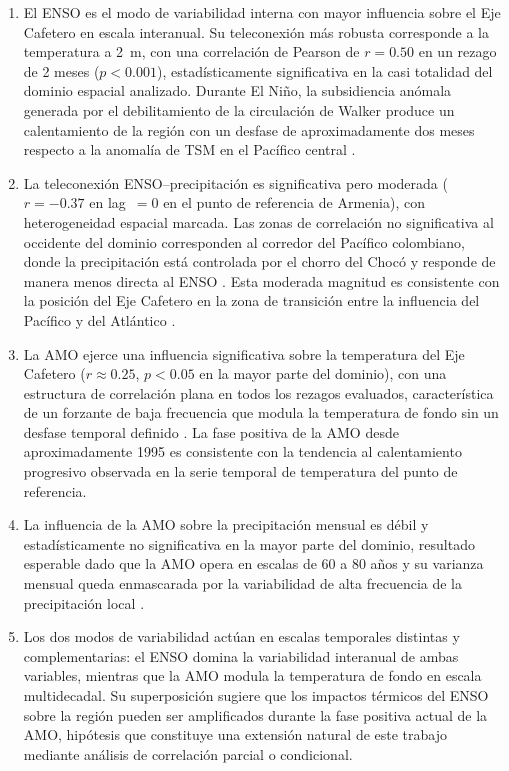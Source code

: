 \documentclass[12pt, a4paper]{article}
\begin{document}
\begin{enumerate}
	
	\item El ENSO es el modo de variabilidad interna con mayor influencia sobre
	el Eje Cafetero en escala interanual. Su teleconexión más robusta corresponde
	a la temperatura a 2~m, con una correlación de Pearson de $r = 0.50$ en un
	rezago de 2 meses ($p < 0.001$), estadísticamente significativa en la casi
	totalidad del dominio espacial analizado. Durante El Niño, la subsidiencia
	anómala generada por el debilitamiento de la circulación de Walker produce
	un calentamiento de la región con un desfase de aproximadamente dos meses
	respecto a la anomalía de TSM en el Pacífico central \citep{Poveda1997,
		CórdobaMachado2015a}.
	
	\item La teleconexión ENSO--precipitación es significativa pero moderada
	($r = -0.37$ en lag~$= 0$ en el punto de referencia de Armenia), con
	heterogeneidad espacial marcada. Las zonas de correlación no significativa
	al occidente del dominio corresponden al corredor del Pacífico colombiano,
	donde la precipitación está controlada por el chorro del Chocó y responde
	de manera menos directa al ENSO \citep{Hoyos2018}. Esta moderada magnitud
	es consistente con la posición del Eje Cafetero en la zona de transición
	entre la influencia del Pacífico y del Atlántico \citep{Poveda2011}.
	
	\item La AMO ejerce una influencia significativa sobre la temperatura del
	Eje Cafetero ($r \approx 0.25$, $p < 0.05$ en la mayor parte del dominio),
	con una estructura de correlación plana en todos los rezagos evaluados,
	característica de un forzante de baja frecuencia que modula la temperatura
	de fondo sin un desfase temporal definido \citep{Knight2006,
		DuqueGardeazabal2025}. La fase positiva de la AMO desde aproximadamente
	1995 es consistente con la tendencia al calentamiento progresivo observada
	en la serie temporal de temperatura del punto de referencia.
	
	\item La influencia de la AMO sobre la precipitación mensual es débil y
	estadísticamente no significativa en la mayor parte del dominio, resultado
	esperable dado que la AMO opera en escalas de 60 a 80 años y su varianza
	mensual queda enmascarada por la variabilidad de alta frecuencia de la
	precipitación local \citep{Enfield2001, Canchala2020}.
	
	\item Los dos modos de variabilidad actúan en escalas temporales distintas
	y complementarias: el ENSO domina la variabilidad interanual de ambas
	variables, mientras que la AMO modula la temperatura de fondo en escala
	multidecadal. Su superposición sugiere que los impactos térmicos del ENSO
	sobre la región pueden ser amplificados durante la fase positiva actual de
	la AMO, hipótesis que constituye una extensión natural de este trabajo
	mediante análisis de correlación parcial o condicional.
	
\end{enumerate}
\end{document}
